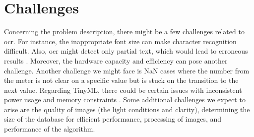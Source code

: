 \section{Challenges}
Concerning the problem description, there might be a few challenges related to \ac{ocr}. For instance, the inappropriate font size can make character recognition difficult. Also,  \ac{ocr}  might detect only partial text, which would lead to erroneous results \autocite{Martin:2021}. Moreover, the hardware capacity and efficiency can pose another challenge. Another challenge we might face is NaN cases where the number from the meter is not clear on a specific value but is stuck on the transition to the next value. Regarding TinyML, there could be certain issues with inconsistent power usage and memory constraints \autocite{Sagar:2020}. Some additional challenges we expect to arise are the quality of images (the light conditions and clarity), determining the size of the database for efficient performance, processing of images, and performance of the algorithm.\\